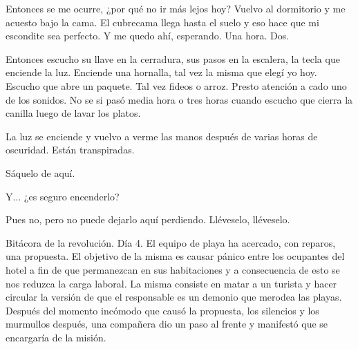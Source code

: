 \documentclass[12pt,twoside,openright,a5paper]{book}
\begin{document}
Entonces se me ocurre, ¿por qué no ir más lejos hoy? Vuelvo al dormitorio
y me acuesto bajo la cama. El cubrecama llega hasta el suelo y eso hace
que mi escondite sea perfecto. Y me quedo ahí, esperando. Una hora. Dos.

Entonces escucho su llave en la cerradura, sus pasos en la escalera, la tecla
que enciende la luz. Enciende una hornalla, tal vez la misma que elegí yo
hoy. Escucho que abre un paquete. Tal vez fideos o arroz. Presto atención
a cado uno de los sonidos. No se si pasó media hora o tres horas cuando
escucho que cierra la canilla luego de lavar los platos.

La luz se enciende y vuelvo a verme las manos después de varias horas de
oscuridad. Están transpiradas.


\vspace{0.5cm}
\hrulefill\hspace{0.2cm} \decofourleft\decofourright \hspace{0.2cm} \hrulefill
\vspace{0.5cm}

Sáquelo de aquí.

Y... ¿es seguro encenderlo?

Pues no, pero no puede dejarlo aquí perdiendo. Lléveselo, lléveselo.


\vspace{0.5cm}
\hrulefill\hspace{0.2cm} \decofourleft\decofourright \hspace{0.2cm} \hrulefill
\vspace{0.5cm}

Bitácora de la revolución. Día 4. El equipo de playa ha acercado, con
reparos, una propuesta. El objetivo de la misma es causar pánico entre
los ocupantes del hotel a fin de que permanezcan en sus habitaciones y a
consecuencia de esto se nos reduzca la carga laboral. La misma consiste en
matar a un turista y hacer circular la versión de que el responsable es un
demonio que merodea las playas. Después del momento incómodo que causó
la propuesta, los silencios y los murmullos después, una compañera dio
un paso al frente y manifestó que se encargaría de la misión.



\vspace{0.5cm}
\hrulefill\hspace{0.2cm} \decofourleft\decofourright \hspace{0.2cm} \hrulefill
\vspace{0.5cm}
\end{document}
